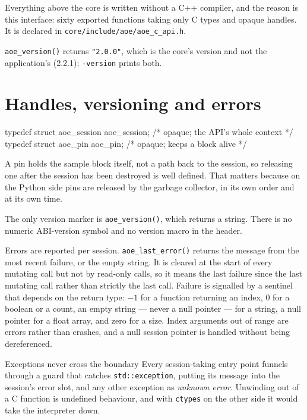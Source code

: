 \documentclass[11pt,a4paper,oneside]{report}
\newcommand{\appver}{2.2.1}
\newcommand{\code}[1]{\texttt{#1}}
\begin{document}
Everything above the core is written without a C++ compiler, and the reason is
this interface: sixty exported functions taking only C types and opaque handles.
It is declared in \code{core/include/aoe/aoe\_c\_api.h}.

\code{aoe\_version()} returns \code{"2.0.0"}, which is the core's version and
not the application's (\appver); \code{-version} prints both.

\section{Handles, versioning and errors}

\begin{aoecode}
typedef struct aoe_session aoe_session;   /* opaque; the API's whole context */
typedef struct aoe_pin     aoe_pin;       /* opaque; keeps a block alive */
\end{aoecode}

A pin holds the sample block itself, not a path back to the session, so
releasing one after the session has been destroyed is well defined. That matters
because on the Python side pins are released by the garbage collector, in its
own order and at its own time.

The only version marker is \code{aoe\_version()}, which returns a string. There
is no numeric ABI-version symbol and no version macro in the header.

Errors are reported per session. \code{aoe\_last\_error()} returns the message
from the most recent failure, or the empty string. It is cleared at the start of
every mutating call but not by read-only calls, so it means the last failure
since the last mutating call rather than strictly the last call. Failure is
signalled by a sentinel that depends on the return type: $-1$ for a function
returning an index, 0 for a boolean or a count, an empty string --- never a null
pointer --- for a string, a null pointer for a float array, and zero for a size.
Index arguments out of range are errors rather than crashes, and a null session
pointer is handled without being dereferenced.

\begin{aoenote}{Exceptions never cross the boundary}
Every session-taking entry point funnels through a guard that catches
\code{std::exception}, putting its message into the session's error slot, and
any other exception as \emph{unknown error}. Unwinding out of a C function is
undefined behaviour, and with \code{ctypes} on the other side it would take the
interpreter down.
\end{aoenote}
\end{document}
